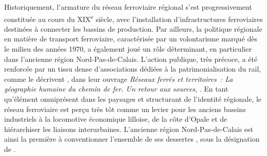 \begin{refsegment}
Historiquement, l’armature du réseau ferroviaire régional s’est progressivement constituée au cours du XIX\textsuperscript{e} siècle, avec l’installation d’infrastructures ferroviaires destinées à connecter les bassins de production. Par ailleurs, la politique régionale en matière de transport ferroviaire, caractérisée par un volontarisme marqué dès le milieu des années 1970, a également joué un rôle déterminant, en particulier dans l’ancienne région Nord-Pas-de-Calais. L'action publique, très précoce, a été renforcée par un tissu dense d'associations dédiées à la patrimonialisation du rail, comme le décrivent \textcolor{blue}{\textcite[146]{baron_reseaux_2017}}, dans leur ouvrage \textsl{Réseaux ferrés et territoires~: La géographie humaine du chemin de fer. Un retour aux sources}, . En tant qu'élément omniprésent dans les paysages et structurant de l'identité régionale, le réseau ferroviaire est perçu très tôt comme un levier pour  les anciens bassins industriels à la locomotive économique lilloise, de  la côte d'Opale et de hiérarchiser les liaisons interurbaines. L'ancienne région Nord-Pas-de-Calais est ainsi la première à conventionner l'ensemble de ses dessertes \textcolor{blue}{\autocite[4]{deimon_projets_2024}}, sous la désignation de  \textcolor{blue}{\autocite[152]{baron_reseaux_2017}}.%


\end{refsegment}
